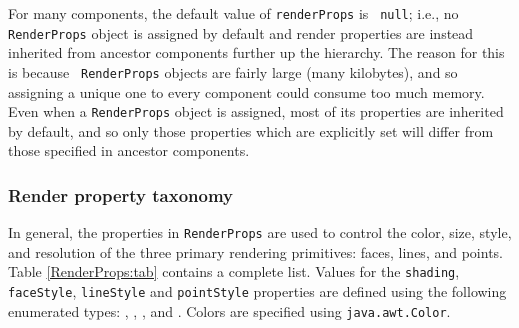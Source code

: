 For many components, the default value of {\tt renderProps} is {\tt
null}; i.e., no {\tt RenderProps} object is assigned by default and
render properties are instead inherited from ancestor components
further up the hierarchy. The reason for this is because {\tt
RenderProps} objects are fairly large (many kilobytes), and so
assigning a unique one to every component could consume too much
memory. Even when a {\tt RenderProps} object is assigned, most of its
properties are inherited by default, and so only those properties
which are explicitly set will differ from those specified in ancestor
components.

\subsubsection{Render property taxonomy}

In general, the properties in {\tt RenderProps} are used to control
the color, size, style, and resolution of the three primary rendering
primitives: faces, lines, and points. Table \ref{RenderProps:tab}
contains a complete list. Values for the {\tt shading}, {\tt
faceStyle}, {\tt lineStyle} and {\tt pointStyle} properties are
defined using the following enumerated types:
, 
, 
, 
and 
.
Colors are specified using {\tt java.awt.Color}.


